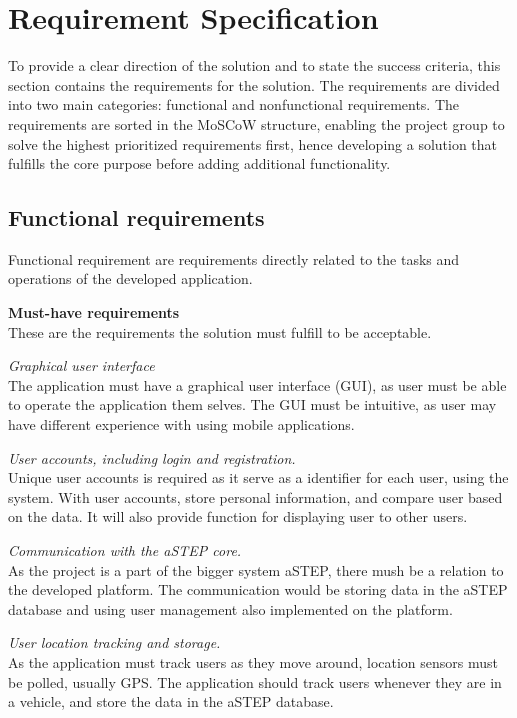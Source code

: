 \section{Requirement Specification}
To provide a clear direction of the solution and to state the success criteria, this section contains the requirements for the solution. 
The requirements are divided into two main categories: functional and nonfunctional requirements. 
The requirements are sorted in the MoSCoW structure, enabling the project group to solve the highest prioritized requirements first, hence developing a solution that fulfills the core purpose before adding additional functionality.


\subsection{Functional requirements}
Functional requirement are requirements directly related to the tasks and operations of the developed application.

\textbf{Must-have requirements}\\
These are the requirements the solution must fulfill to be acceptable.

\textit{Graphical user interface}\\
The application must have a graphical user interface (GUI), as user must be able to operate the application them selves. 
The GUI must be intuitive, as user may have different experience with using mobile applications.

\textit{User accounts, including login and registration.}\\
Unique user accounts is required as it serve as a identifier for each user, using the system. With user accounts, store personal information, and compare user based on the data. 
It will also provide function for displaying user to other users.

\textit{Communication with the aSTEP core.}\\
As the project is a part of the bigger system aSTEP, there mush be a relation to the developed platform. 
The communication would be storing data in the aSTEP database and using user management also implemented on the platform.

\textit{User location tracking and storage.}\\
As the application must track users as they move around, location sensors must be polled, usually GPS. 
The application should track users whenever they are in a vehicle, and store the data in the aSTEP database. 

